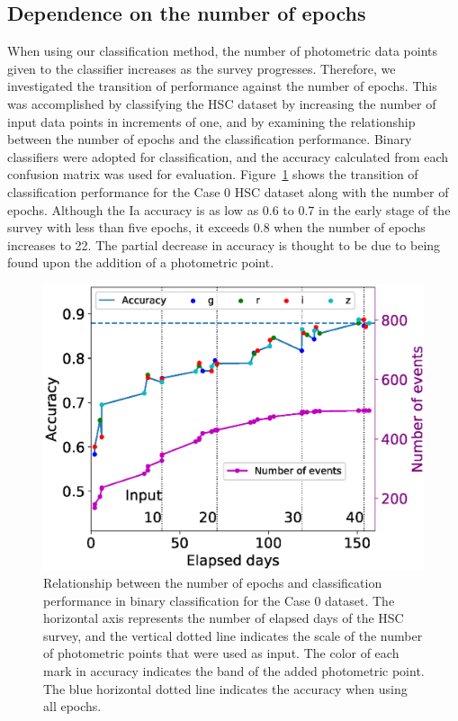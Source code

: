\documentclass[proof]{pasj01}
\providecommand{\DIFadd}[1]{{\protect\color{blue} \sf #1}} %
\providecommand{\DIFdel}[1]{{\protect\color{red} \scriptsize #1}} %
\providecommand{\DIFaddbegin}{\protect\color{blue}} %
\providecommand{\DIFaddend}{\protect\color{black}} %
\providecommand{\DIFdelbegin}{\protect\color{red}} %
\providecommand{\DIFdelend}{\protect\color{black}} %
\newcommand{\DIFscaledelfig}{0.5}
\newlength{\DIFdelgraphicswidth} %
\newlength{\DIFdelgraphicsheight} %
\newcommand{\DIFaddincludegraphics}[2][]{{\color{blue}\fbox{\DIFOincludegraphics[#1]{#2}}}} %
\newcommand{\DIFdelincludegraphics}[2][]{%
\sbox{\DIFdelgraphicsbox}{\DIFOincludegraphics[#1]{#2}}%
\settoboxwidth{\DIFdelgraphicswidth}{\DIFdelgraphicsbox} %
\settoboxtotalheight{\DIFdelgraphicsheight}{\DIFdelgraphicsbox} %
\scalebox{\DIFscaledelfig}{%
\parbox[b]{\DIFdelgraphicswidth}{\usebox{\DIFdelgraphicsbox}\\[-\baselineskip] \rule{\DIFdelgraphicswidth}{0em}}\llap{\resizebox{\DIFdelgraphicswidth}{\DIFdelgraphicsheight}{%
\setlength{\unitlength}{\DIFdelgraphicswidth}%
\begin{picture}(1,1)%
\thicklines\linethickness{2pt} %
{\color[rgb]{1,0,0}\put(0,0){\framebox(1,1){}}}%
{\color[rgb]{1,0,0}\put(0,0){\line( 1,1){1}}}%
{\color[rgb]{1,0,0}\put(0,1){\line(1,-1){1}}}%
\end{picture}%
}\hspace*{3pt}}} %
} %
\DeclareRobustCommand{\DIFaddbegin}{\DIFOaddbegin \let\includegraphics\DIFaddincludegraphics} %
\DeclareRobustCommand{\DIFaddend}{\DIFOaddend \let\includegraphics\DIFOincludegraphics} %
\DeclareRobustCommand{\DIFdelbegin}{\DIFOdelbegin \let\includegraphics\DIFdelincludegraphics} %
\DeclareRobustCommand{\DIFdelend}{\DIFOaddend \let\includegraphics\DIFOincludegraphics} %
\begin{document}
\subsection{Dependence on the number of epochs}
%
When using our classification method, the number of photometric data points given to the classifier increases as the survey progresses.
Therefore, we investigated the transition of performance against the number of epochs.
This was accomplished by classifying the HSC dataset by increasing the number of input data points in increments of one, and by examining the relationship between the number of epochs and the classification performance.
Binary classifiers were adopted for classification, and the accuracy calculated from each confusion matrix was used for evaluation.
Figure\ \ref{fig:n_observations} shows the transition of classification performance for the Case 0 HSC dataset along with the number of epochs.
Although the Ia accuracy is as low as 0.6 to 0.7 in the early stage of the survey with less than five epochs, it exceeds 0.8 when the number of epochs increases to 22.
The partial decrease in accuracy is thought to be due to \DIFdelbegin \DIFdel{the new SNe }\DIFdelend \DIFaddbegin \DIFadd{a new SN }\DIFaddend being found upon the addition of a photometric point.
%
\begin{figure}[htbp]
  \begin{center}
     \includegraphics[width=\columnwidth]{figures/n_observations_v2_case0.eps}
  \end{center}
  \caption{%
  Relationship between the number of epochs and classification performance in binary classification for the Case 0 dataset. 
  The horizontal axis represents the number of elapsed days of the HSC survey, and the vertical dotted line indicates the scale of the number of photometric points that were used as input. 
  The color of each mark in accuracy indicates the band of the added photometric point. 
  The blue horizontal dotted line indicates the accuracy when using all epochs.
  }%
  \label{fig:n_observations}
\end{figure}
%
\end{document}
